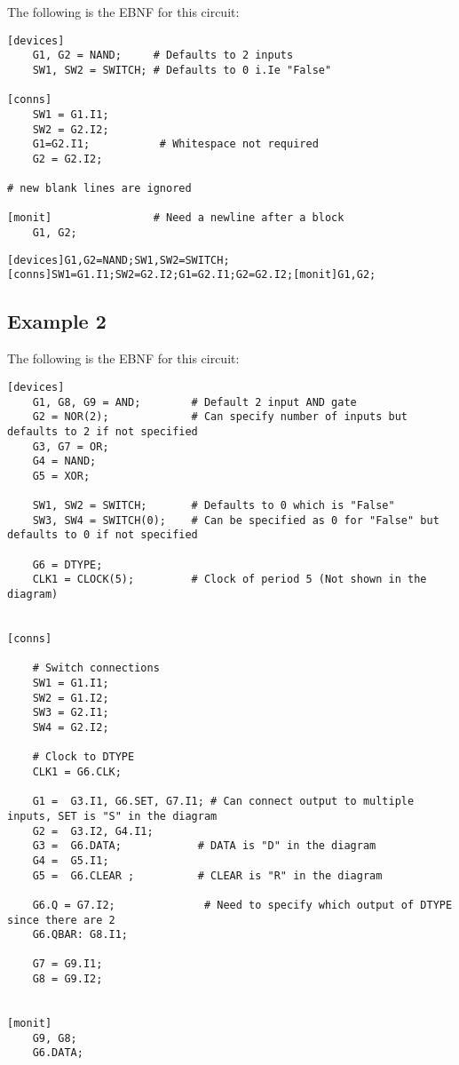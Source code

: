 \documentclass[10pt]{article}
\begin{document}
\FloatBarrier

\FloatBarrier
The following is the EBNF for this circuit:

\begin{lstlisting}[caption=Code for example 1]
[devices] 
	G1, G2 = NAND;     # Defaults to 2 inputs
	SW1, SW2 = SWITCH; # Defaults to 0 i.Ie "False"

[conns]
	SW1 = G1.I1;
	SW2 = G2.I2;
	G1=G2.I1;           # Whitespace not required
	G2 = G2.I2;

# new blank lines are ignored

[monit]                # Need a newline after a block
	G1, G2;

\end{lstlisting}

\begin{lstlisting}[caption=Obfuscated Code]
[devices]G1,G2=NAND;SW1,SW2=SWITCH;[conns]SW1=G1.I1;SW2=G2.I2;G1=G2.I1;G2=G2.I2;[monit]G1,G2;
\end{lstlisting}

\newpage

\subsection{Example 2}

\FloatBarrier

\FloatBarrier
The following is the EBNF for this circuit:

\begin{lstlisting}[caption=Code for Example 2]
[devices]
    G1, G8, G9 = AND;        # Default 2 input AND gate
    G2 = NOR(2);             # Can specify number of inputs but defaults to 2 if not specified
    G3, G7 = OR;		  
    G4 = NAND;
    G5 = XOR;

    SW1, SW2 = SWITCH;       # Defaults to 0 which is "False"
    SW3, SW4 = SWITCH(0);    # Can be specified as 0 for "False" but defaults to 0 if not specified

    G6 = DTYPE;
    CLK1 = CLOCK(5);         # Clock of period 5 (Not shown in the diagram)


[conns]

    # Switch connections
    SW1 = G1.I1;
    SW2 = G1.I2;
    SW3 = G2.I1;
    SW4 = G2.I2;

    # Clock to DTYPE
    CLK1 = G6.CLK;

    G1 =  G3.I1, G6.SET, G7.I1; # Can connect output to multiple inputs, SET is "S" in the diagram
    G2 =  G3.I2, G4.I1;
    G3 =  G6.DATA;            # DATA is "D" in the diagram
    G4 =  G5.I1;
    G5 =  G6.CLEAR ;          # CLEAR is "R" in the diagram

    G6.Q = G7.I2;              # Need to specify which output of DTYPE since there are 2
    G6.QBAR: G8.I1;

    G7 = G9.I1;
    G8 = G9.I2;


[monit]
    G9, G8;
    G6.DATA;
\end{lstlisting}
\end{document}
